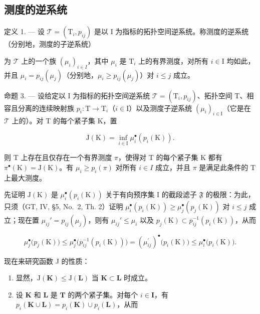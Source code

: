 \subsection{测度的逆系统}

定义 1. --- 设 \(\mathcal{T} = (\mathrm{T}_i, p_{ij})\) 是以 I 为指标的拓扑空间逆系统。称测度的逆系统（分别地，测度的子逆系统）

为 \(\mathcal{T}\) 上的一个族 \((\mu_i)_{i\in I}\)，其中 \(\mu_i\) 是 \(\mathrm{T}_i\) 上的有界测度，对所有 \(i\in \mathrm{I}\) 均如此，并且 \(\mu_i = p_{ij}(\mu_j)\)（分别地，\(\mu_i\geqslant p_{ij}(\mu_j)\)）对 \(i\leqslant j\) 成立。

命题 3. --- 设给定以 I 为指标的拓扑空间逆系统 \(\mathcal{T} = (\mathrm{T}_i, p_{ij})\)、拓扑空间 T、相容且分离的连续映射族 \(p_i: \mathrm{T} \to \mathrm{T}_i\)（\(i \in \mathrm{I}\)）以及测度子逆系统 \((\mu_i)_{i \in \mathrm{I}}\)（它是在 \(\mathcal{T}\) 上的）。对 T 的每个紧子集 K，置

\[
\mathrm{J} (\mathrm{K}) = \inf _ {i \in \mathrm{I}} \mu_ {i} ^ {\bullet} (p _ {i} (\mathrm{K})).\tag{1}
\]

则 T 上存在且仅存在一个有界测度 \(\pi\)，使得对 T 的每个紧子集 K 都有 \(\pi^{\bullet}(\mathrm{K}) = \mathrm{J}(\mathrm{K})\)。有 \(\mu_i \geqslant p_i(\pi)\) 对所有 \(i \in I\) 成立，并且 \(\pi\) 是满足此条件的 T 上最大测度。

先证明 \(\mathrm{J}(\mathrm{K})\) 是 \(\mu_i^\bullet (p_i(\mathrm{K}))\) 关于有向预序集 I 的截段滤子 \(\mathfrak{F}\) 的极限：为此，只须（GT, IV, §5, No.~2, Th. 2）证明 \(\mu_i^\bullet (p_i(\mathrm{K})) \geqslant \mu_j^\bullet (p_j(\mathrm{K}))\) 对 \(i \leqslant j\) 成立；现在置 \(\mu_{ij}' = p_{ij}(\mu_j)\)，则有 \(\mu_{ij}' \leqslant \mu_i\) 以及 \(p_j(\mathrm{K}) \subset \overline{p}_{ij}^{-1}(p_i(\mathrm{K}))\)，从而

\[
\mu_ {j} ^ {\bullet} \big (p _ {j} (\mathrm{K}) \big) \leqslant \mu_ {j} ^ {\bullet} \big (\overline{p}_{ij}^{-1} (p _ {i} (\mathrm{K})) \big) = (\mu_ {i j} ^ {\prime}) ^ {\bullet} \big (p _ {i} (\mathrm{K}) \big) \leqslant \mu_ {i} ^ {\bullet} \big (p _ {i} (\mathrm{K}) \big).
\]

现在来研究函数 J 的性质：

\begin{enumerate}
\def\labelenumi{\arabic{enumi})}
\item
  显然，\(\mathrm{J}(\mathbf{K})\leqslant \mathrm{J}(\mathbf{L})\) 当 \(\mathbf{K}\subset \mathbf{L}\) 时成立。
\item
  设 \(\mathbf{K}\) 和 \(\mathbf{L}\) 是 \(\mathbf{T}\) 的两个紧子集。对每个 \(i \in \mathbf{I}\)，有 \(p_i(\mathbf{K} \cup \mathbf{L}) = p_i(\mathbf{K}) \cup p_i(\mathbf{L})\)，从而
\end{enumerate}


